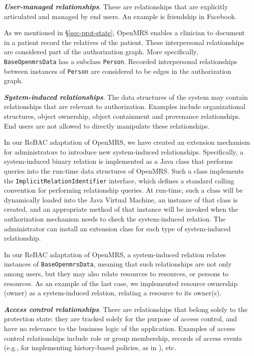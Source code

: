 \documentclass{acm_proc_article-sp}
\newcommand{\Dfn}[1]{\textbf{\emph{#1}}}
\newcommand{\textcode}[1]{\texttt{#1}}
\begin{document}
\begin{compactenum}
\item \Dfn{User-managed relationships}.  These are relationships that
  are explicitly articulated and managed by end users.  An example is
  friendship in Facebook.

  As we mentioned in \S \ref{sec-prot-state}, OpenMRS enables a
  clinician to document in a patient record the relatives of the
  patient.  These interpersonal relationships are considered part of
  the authorization graph.  More specifically,
  \textcode{BaseOpenmrsData} has a subclass \textcode{Person}.
  Recorded interpersonal relationships between instances of
  \textcode{Person} are considered to be edges in the authorization
  graph.

\item \Dfn{System-induced relationships}.
  The data structures of the system may contain
  relationships that are relevant to authorization.
  Examples include organizational structures, object 
  ownership, object containment and provenance relationships.
  End users are not allowed to directly manipulate these
  relationships.

  In our ReBAC adaptation of OpenMRS, we have created an extension
  mechanism for administrators to introduce new system-induced
  relationships.  Specifically, a system-induced binary relation is
  implemented as a Java class that performs queries into the run-time
  data structures of OpenMRS.  Such a class implements the
  \textcode{ImplicitRelationIdentifier} interface, which defines a
  standard calling convention for performing relationship queries.  At
  run-time, such a class will be dynamically loaded into the Java
  Virtual Machine,
an instance of that class is
  created, and an appropriate method of that instance will be invoked
  when the authorization mechanism needs to check the system-induced
  relation.  The administrator can install an extension class for each
  type of system-induced relationship.

  In our ReBAC adaptation of OpenMRS, a system-induced relation
  relates instances of \textcode{BaseOpenmrsData}, meaning that such
  relationships are not only among users, but they may also relate
  resources to resources, or persons to resources.  As an example of
  the last case, we implemented resource ownership (\textsf{owner}) as
  a system-induced relation, relating a resource to its owner(s).
  
\item \Dfn{Access control relationships}.  There are relationships
  that belong solely to the protection state: they are tracked solely
  for the purpose of access control, and have no relevance to the
  business logic of the application.  Examples of access control
  relationships include role or group membership, records of
  access events (e.g., for implementing history-based policies,
  as in \cite{Fong-etal:2013}), etc.


\end{compactenum}
\end{document}
